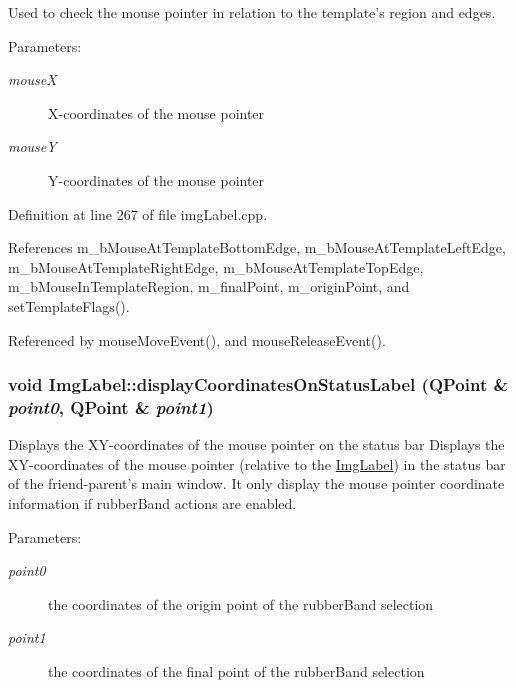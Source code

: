 Used to check the mouse pointer in relation to the template's region and edges. 

\begin{Desc}
\item[Parameters:]
\begin{description}
\item[{\em mouseX}]X-coordinates of the mouse pointer \item[{\em mouseY}]Y-coordinates of the mouse pointer \end{description}
\end{Desc}


Definition at line 267 of file imgLabel.cpp.

References m\_\-bMouseAtTemplateBottomEdge, m\_\-bMouseAtTemplateLeftEdge, m\_\-bMouseAtTemplateRightEdge, m\_\-bMouseAtTemplateTopEdge, m\_\-bMouseInTemplateRegion, m\_\-finalPoint, m\_\-originPoint, and setTemplateFlags().

Referenced by mouseMoveEvent(), and mouseReleaseEvent().\hypertarget{classImgLabel_f8fb1abf00b305d1ba4d8b4745b59692}{
\subsubsection[{displayCoordinatesOnStatusLabel}]{\setlength{\rightskip}{0pt plus 5cm}void ImgLabel::displayCoordinatesOnStatusLabel (QPoint \& {\em point0}, \/  QPoint \& {\em point1})}}
\label{classImgLabel_f8fb1abf00b305d1ba4d8b4745b59692}


Displays the XY-coordinates of the mouse pointer on the status bar Displays the XY-coordinates of the mouse pointer (relative to the \hyperlink{classImgLabel}{ImgLabel}) in the status bar of the friend-parent's main window. It only display the mouse pointer coordinate information if rubberBand actions are enabled. 

\begin{Desc}
\item[Parameters:]
\begin{description}
\item[{\em point0}]the coordinates of the origin point of the rubberBand selection \item[{\em point1}]the coordinates of the final point of the rubberBand selection \end{description}
\end{Desc}


